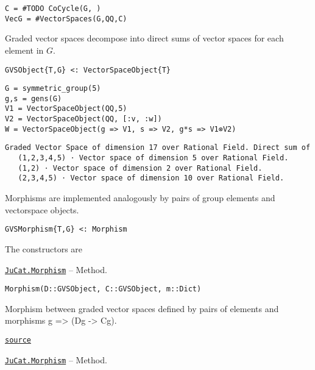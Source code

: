 \documentclass{memoir}
\begin{document}
\begin{lstlisting}
C = #TODO CoCycle(G, )
VecG = #VectorSpaces(G,QQ,C)
\end{lstlisting}



Graded vector spaces decompose into direct sums of vector spaces for each element in \(G\).




\begin{lstlisting}
GVSObject{T,G} <: VectorSpaceObject{T}
\end{lstlisting}




\begin{verbatim}
G = symmetric_group(5)
g,s = gens(G)
V1 = VectorSpaceObject(QQ,5)
V2 = VectorSpaceObject(QQ, [:v, :w])
W = VectorSpaceObject(g => V1, s => V2, g*s => V1⊗V2)
\end{verbatim}


\begin{lstlisting}
Graded Vector Space of dimension 17 over Rational Field. Direct sum of 
   (1,2,3,4,5) ⋅ Vector space of dimension 5 over Rational Field.
   (1,2) ⋅ Vector space of dimension 2 over Rational Field.
   (2,3,4,5) ⋅ Vector space of dimension 10 over Rational Field.

\end{lstlisting}



Morphisms are implemented analogously by pairs of group elements and vectorspace objects.




\begin{lstlisting}
GVSMorphism{T,G} <: Morphism
\end{lstlisting}



The constructors are


\hypertarget{17488230208688022226}{} 
\hyperlink{17488230208688022226}{\texttt{JuCat.Morphism}}  -- {Method.}

\begin{adjustwidth}{2em}{0pt}


\begin{verbatim}
Morphism(D::GVSObject, C::GVSObject, m::Dict)
\end{verbatim}

Morphism between graded vector spaces defined by pairs of elements and morphisms g => (Dg -> Cg).



\href{https://github.com/FabianMaeurer/JuCat.jl/blob/367390e2d003deec2ababa73caeab405e934bb35/src/structures/VectorSpaces/GradedVectorSpaces.jl#L48-L53}{\texttt{source}}


\end{adjustwidth}
\hypertarget{7177969606607283338}{} 
\hyperlink{7177969606607283338}{\texttt{JuCat.Morphism}}  -- {Method.}
\end{document}
